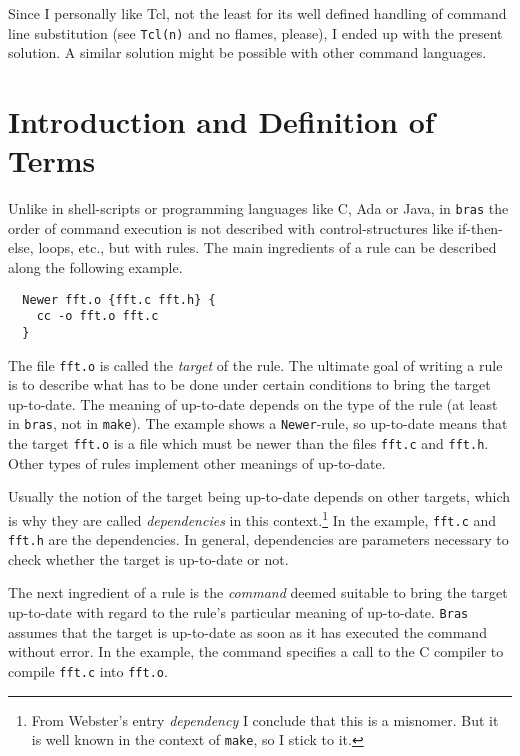 \documentclass[12pt]{article}
\newcommand{\bras}{\texttt{bras}}
\newcommand{\Bras}{\texttt{Bras}}
\newcommand{\make}{\texttt{make}}
\begin{document}
Since I personally like Tcl, not the least for its well defined
handling of command line substitution (see \texttt{Tcl(n)} and no
flames, please), I ended up with the present solution. A similar
solution might be possible with other command languages.


\section{Introduction and Definition of Terms}
\label{SecDefTerms}

Unlike in shell-scripts or programming languages like C, Ada or Java,
in \bras{} the order of command execution is not described with
control-structures like if-then-else, loops, etc., but with rules.
The main ingredients of a rule can be described along the following
example.

\begin{verbatim}
  Newer fft.o {fft.c fft.h} {
    cc -o fft.o fft.c
  }
\end{verbatim}

The file \texttt{fft.o} is called the \textit{target} of the rule. The
ultimate goal of writing a rule is to describe what has to be done
under certain conditions to bring the target up-to-date. The meaning
of up-to-date depends on the type of the rule (at least in
\bras{}, not in \make{}). The example shows a \texttt{Newer}-rule, so
up-to-date means that the target \texttt{fft.o} is a file which must
be newer than the files \texttt{fft.c} and \texttt{fft.h}.  Other
types of rules implement other meanings of up-to-date.

Usually the notion of the target being up-to-date depends on other
targets, which is why they are called \textit{dependencies} in this
context.\footnote{From Webster's entry \textit{dependency} I conclude
that this is a misnomer. But it is well known in the context of
\make{}, so I stick to it.} In the example,
\texttt{fft.c} and \texttt{fft.h} are the dependencies. In general,
dependencies are parameters necessary to check whether the
target is up-to-date or not.

The next ingredient of a rule is the \textit{command} deemed suitable
to bring the target up-to-date with regard to the rule's particular
meaning of up-to-date. \Bras{} assumes that the target
is up-to-date as soon as it has executed the command without error. In
the example, the command specifies a call to the C compiler to compile
\texttt{fft.c} into \texttt{fft.o}.
\end{document}
